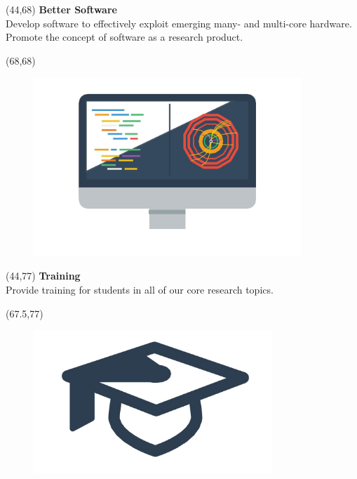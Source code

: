 \documentclass[final]{beamer}
\begin{document}
\begin{frame}{}
\begin{textblock}{23}(44,68)
\textcolor{mybluelabel}{\bf Better Software} \\
Develop software to effectively exploit emerging many- and multi-core hardware. 
Promote the concept of software as a research product.
\end{textblock}

\begin{textblock}{12.0}(68,68)
\begin{figure}[tbph]
\centering
\includegraphics[width=0.9\textwidth]{better-software.jpg}
\end{figure}
\end{textblock}

\begin{textblock}{22.5}(44,77)
\textcolor{mybluelabel}{\bf Training} \\
Provide training for students in all of our core research topics.
\end{textblock}

\begin{textblock}{12.5}(67.5,77)
\begin{figure}[tbph]
\centering
\includegraphics[width=0.8\textwidth]{training.jpg}
\end{figure}
\end{textblock}



\end{frame}
\end{document}
